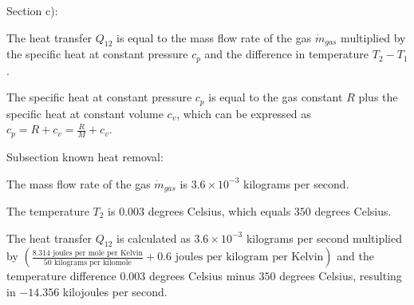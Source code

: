 Section c):

The heat transfer \( Q_{12} \) is equal to the mass flow rate of the gas \( \dot{m}_{gas} \) multiplied by the specific heat at constant pressure \( c_p \) and the difference in temperature \( T_2 - T_1 \).

The specific heat at constant pressure \( c_p \) is equal to the gas constant \( R \) plus the specific heat at constant volume \( c_v \), which can be expressed as \( c_p = R + c_v = \frac{R}{M} + c_v \).

Subsection known heat removal:

The mass flow rate of the gas \( \dot{m}_{gas} \) is \( 3.6 \times 10^{-3} \) kilograms per second.

The temperature \( T_2 \) is \( 0.003 \) degrees Celsius, which equals \( 350 \) degrees Celsius.

The heat transfer \( Q_{12} \) is calculated as \( 3.6 \times 10^{-3} \) kilograms per second multiplied by \( \left( \frac{8.314 \text{ joules per mole per Kelvin}}{50 \text{ kilograms per kilomole}} + 0.6 \text{ joules per kilogram per Kelvin} \right) \) and the temperature difference \( 0.003 \) degrees Celsius minus \( 350 \) degrees Celsius, resulting in \( -14.356 \) kilojoules per second.